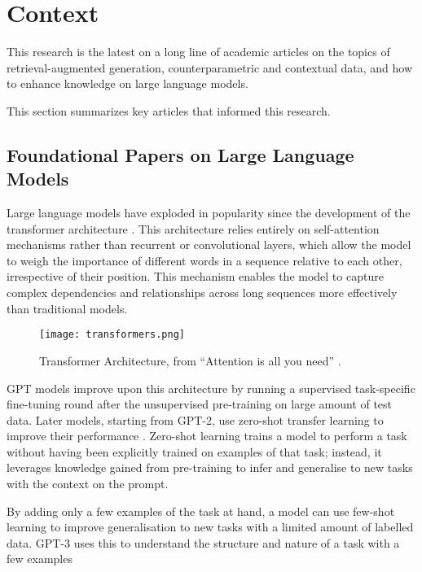 \section{Context}

This research is the latest on a long line of academic articles on the topics of retrieval-augmented generation, counterparametric and contextual data, and how to enhance knowledge on large language models.

This section summarizes key articles that informed this research.

\subsection{Foundational Papers on Large Language Models}

Large language models have exploded in popularity since the development of the transformer architecture \citep{attention_is_all_you_need}.
This architecture relies entirely on self-attention mechanisms rather than recurrent or convolutional layers, which allow the model to weigh the importance of different words in a sequence relative to each other, irrespective of their position.
This mechanism enables the model to capture complex dependencies and relationships across long sequences more effectively than traditional models.

\begin{figure}[htb]
	\centering
	\texttt{[image: transformers.png]}
	\caption{Transformer Architecture, from ``Attention is all you need'' \citep{attention_is_all_you_need}.}
\end{figure}

GPT models \citep{gpt} improve upon this architecture by running a supervised task-specific fine-tuning round after the unsupervised pre-training on large amount of test data.
Later models, starting from GPT-2, use zero-shot transfer learning to improve their performance \citep{gpt2}.
Zero-shot learning \citep{zeroshotlearning} trains a model to perform a task without having been explicitly trained on examples of that task; instead, it leverages knowledge gained from pre-training to infer and generalise to new tasks with the context on the prompt.

By adding only a few examples of the task at hand, a model can use few-shot learning to improve generalisation to new tasks with a limited amount of labelled data.
GPT-3 uses this to understand the structure and nature of a task with a few examples \citep{gpt3}

